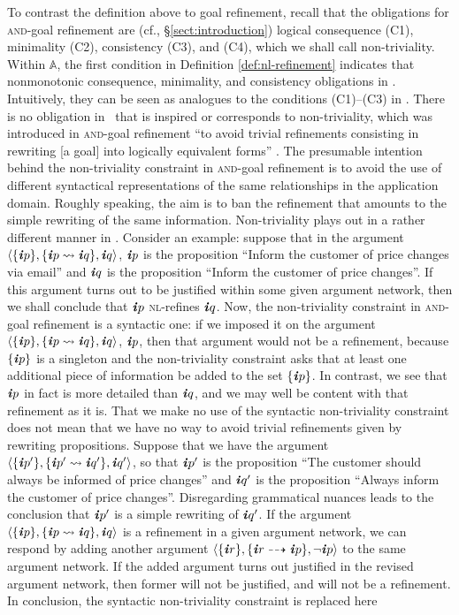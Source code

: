 \documentclass[10pt, conference, compsocconf]{IEEEtran}
\begin{document}
To contrast the definition above to goal refinement, recall that the obligations for \textsc{and}-goal refinement are (cf., \S\ref{sect:introduction}) logical consequence (C1), minimality (C2), consistency (C3), and (C4), which we shall call non-triviality. Within $\mathbb{A}$, the first condition in Definition \ref{def:nl-refinement} indicates that nonmonotonic consequence, minimality, and consistency obligations in \nlref. Intuitively, they can be seen as analogues to the conditions (C1)--(C3) in \nlref. There is no obligation in \nlref\ that is inspired or corresponds to non-triviality, which was introduced in \textsc{and}-goal refinement ``to avoid trivial refinements consisting in rewriting [a goal] into logically equivalent forms'' \cite{Darimont+:1996:FSE}. The presumable intention behind the non-triviality constraint in \textsc{and}-goal refinement is to avoid the use of different syntactical representations of the same relationships in the application domain. Roughly speaking, the aim is to ban the refinement that amounts to the simple rewriting of the same information. Non-triviality plays out in a rather different manner in \nlref. Consider an example: suppose that in the argument $\langle \{ \textbf{\textit{i}}p \}, \{ \textbf{\textit{i}}p \rightsquigarrow \textbf{\textit{i}}q \}, \textbf{\textit{i}}q \rangle$, $\textbf{\textit{i}}p$ is the proposition ``\textsf{Inform the customer of price changes via email}'' and $\textbf{\textit{i}}q$ is the proposition ``\textsf{Inform the customer of price changes}''. If this argument turns out to be justified within some given argument network, then we shall conclude that $\textbf{\textit{i}}p$ \textsc{nl}-refines $\textbf{\textit{i}}q$. Now, the non-triviality constraint in \textsc{and}-goal refinement is a syntactic one: if we imposed it on the argument $\langle \{ \textbf{\textit{i}}p \}, \{ \textbf{\textit{i}}p \rightsquigarrow \textbf{\textit{i}}q \}, \textbf{\textit{i}}q \rangle$, $\textbf{\textit{i}}p$, then that argument would not be a refinement, because $\{ \textbf{\textit{i}}p \}$ is a singleton and the non-triviality constraint asks that at least one additional piece of information be added to the set $\{ \textbf{\textit{i}}p \}$. In contrast, we see that $\textbf{\textit{i}}p$ in fact is more detailed than $\textbf{\textit{i}}q$, and we may well be content with that refinement as it is. That we make no use of the syntactic non-triviality constraint does not mean that we have no way to avoid trivial refinements given by rewriting propositions. Suppose that we have the argument $\langle \{ \textbf{\textit{i}}p^{\prime} \}, \{ \textbf{\textit{i}}p^{\prime} \rightsquigarrow \textbf{\textit{i}}q^{\prime} \}, \textbf{\textit{i}}q^{\prime} \rangle$, so that $\textbf{\textit{i}}p^{\prime}$ is the proposition ``\textsf{The customer should always be informed of price changes}'' and $\textbf{\textit{i}}q^{\prime}$ is the proposition ``\textsf{Always inform the customer of price changes}''. Disregarding grammatical nuances leads to the conclusion that $\textbf{\textit{i}}p^{\prime}$ is a simple rewriting of $\textbf{\textit{i}}q^{\prime}$. If the argument $\langle \{ \textbf{\textit{i}}p \}, \{ \textbf{\textit{i}}p \rightsquigarrow \textbf{\textit{i}}q \}, \textbf{\textit{i}}q \rangle$ is a refinement in a given argument network, we can respond by adding another argument $\langle \{ \textbf{\textit{i}}r \}, \{ \textbf{\textit{i}}r \dashrightarrow \textbf{\textit{i}}p \}, \neg\textbf{\textit{i}}p \rangle$ to the same argument network. If the added argument turns out justified in the revised argument network, then former will not be justified, and will not be a refinement. In conclusion, the syntactic non-triviality constraint is replaced here 
\end{document}
